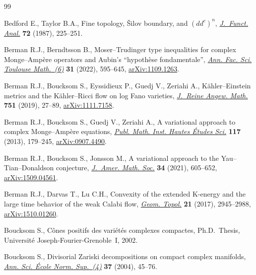 \documentclass[pdftex]{sigma}
\numberwithin{equation}{section}
\theoremstyle{plain}
\begin{document}
\begin{thebibliography}{99}
\footnotesize\itemsep=0pt

Bedford E., Taylor B.A., Fine topology, \v{S}ilov boundary, and {$(dd^c)^n$},
 \href{https://doi.org/10.1016/0022-1236(87)90087-5}{\textit{J.~Funct. Anal.}} \textbf{72} (1987), 225--251.

Berman R.J., Berndtsson B., Moser--{T}rudinger type inequalities for complex
 {M}onge--{A}mp\`ere operators and {A}ubin's ``hypoth\`ese fondamentale'',
 \href{https://doi.org/10.5802/afst.170}{\textit{Ann. Fac. Sci. Toulouse Math.~(6)}} \textbf{31} (2022), 595--645,
 \href{https://arxiv.org/abs/1109.1263}{arXiv:1109.1263}.

Berman R.J., Boucksom S., Eyssidieux P., Guedj V., Zeriahi A.,
 K\"ahler--{E}instein metrics and the {K}\"ahler--{R}icci flow on log {F}ano
 varieties, \href{https://doi.org/10.1515/crelle-2016-0033}{\textit{J.~Reine Angew. Math.}} \textbf{751} (2019), 27--89,
 \href{https://arxiv.org/abs/1111.7158}{arXiv:1111.7158}.

Berman R.J., Boucksom S., Guedj V., Zeriahi A., A variational approach to
 complex {M}onge--{A}mp\`ere equations, \href{https://doi.org/10.1007/s10240-012-0046-6}{\textit{Publ. Math. Inst. Hautes
 \'Etudes Sci.}} \textbf{117} (2013), 179--245, \href{https://arxiv.org/abs/0907.4490}{arXiv:0907.4490}.

Berman R.J., Boucksom S., Jonsson M., A variational approach to the
 {Y}au--{T}ian--{D}onaldson conjecture, \href{https://doi.org/10.1090/jams/964}{\textit{J.~Amer. Math. Soc.}}
 \textbf{34} (2021), 605--652, \href{https://arxiv.org/abs/1509.04561}{arXiv:1509.04561}.

Berman R.J., Darvas T., Lu C.H., Convexity of the extended {K}-energy and the
 large time behavior of the weak {C}alabi flow, \href{https://doi.org/10.2140/gt.2017.21.2945}{\textit{Geom. Topol.}}
 \textbf{21} (2017), 2945--2988, \href{https://arxiv.org/abs/1510.01260}{arXiv:1510.01260}.

Boucksom S., C\^ones positifs des vari\'et\'es complexes compactes, Ph.D.~Thesis, {U}niversit\'e {J}oseph-{F}ourier-{G}renoble~{I}, 2002.

Boucksom S., Divisorial {Z}ariski decompositions on compact complex manifolds,
 \href{https://doi.org/10.1016/j.ansens.2003.04.002}{\textit{Ann. Sci. \'Ecole Norm. Sup.~(4)}} \textbf{37} (2004), 45--76.


\end{thebibliography}
\end{document}
